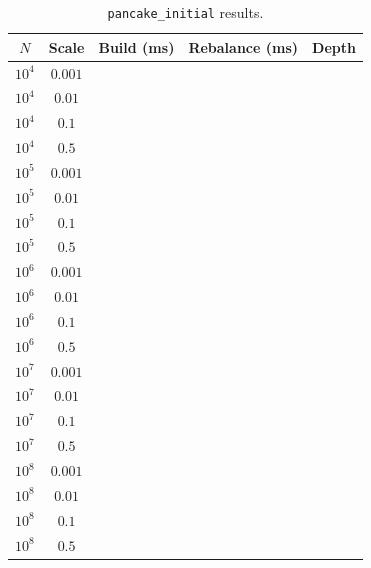 \begin{table}[ht]
    \centering
    \caption{\texttt{pancake\_initial} results.}
    \label{tab:pancake_results}
    \begin{tabular}{|c|c|c|c|c|}
        \hline
        \textbf{$N$} & \textbf{Scale} & \textbf{Build (ms)} & \textbf{Rebalance (ms)} & \textbf{Depth} \\
        \hline
        $10^4$ & $0.001$ & & & \\
        $10^4$ & $0.01$  & & & \\
        $10^4$ & $0.1$   & & & \\
        $10^4$ & $0.5$   & & & \\
        \hline
        $10^5$ & $0.001$ & & & \\
        $10^5$ & $0.01$  & & & \\
        $10^5$ & $0.1$   & & & \\
        $10^5$ & $0.5$   & & & \\
        \hline
        $10^6$ & $0.001$ & & & \\
        $10^6$ & $0.01$  & & & \\
        $10^6$ & $0.1$   & & & \\
        $10^6$ & $0.5$   & & & \\
        \hline
        $10^7$ & $0.001$ & & & \\
        $10^7$ & $0.01$  & & & \\
        $10^7$ & $0.1$   & & & \\
        $10^7$ & $0.5$   & & & \\
        \hline
        $10^8$ & $0.001$ & & & \\
        $10^8$ & $0.01$  & & & \\
        $10^8$ & $0.1$   & & & \\
        $10^8$ & $0.5$   & & & \\
        \hline
    \end{tabular}
\end{table}


